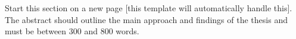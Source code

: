 %
%
%
%
%


Start this section on a new page [this template will automatically handle this].
The abstract should outline the main approach and findings of the thesis and must be between 300 and 800 words.

%